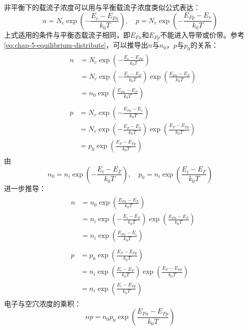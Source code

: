 非平衡下的载流子浓度可以用与平衡载流子浓度类似公式表达：
\begin{equation}
    n=N_c\exp{\left(-\frac{E_c-E_{Fn}}{k_0T}\right)},\quad p=N_v\exp{\left(-\frac{E_{Fp}-E_v}{k_0T}\right)}
\end{equation}
上式适用的条件与平衡态载流子相同，即$E_{Fn}$和$E_{Fp}$不能进入导带或价带。参考\autoref{eq:chap-5-equilibrium-distribute}，可以推导出$n$与$n_0$，$p$与$p_0$的关系：
\begin{align}
&
\begin{aligned}
    n&=N_c\exp{\left(-\frac{E_c-E_{Fn}}{k_0T}\right)}\\
    &=N_c\exp{\left(-\frac{E_c-E_{F}}{k_0T}\right)}\exp{\left(\frac{E_{Fn}-E_F}{k_0T}\right)}\\
    &=n_0\exp{\left(\frac{E_{Fn}-E_F}{k_0T}\right)}
\end{aligned}
\\
&
\begin{aligned}
    p&=N_v\exp{\left(-\frac{E_{Fp}-E_v}{k_0T}\right)}\\
    &=N_v\exp{\left(-\frac{E_{F}-E_v}{k_0T}\right)}\exp{\left(\frac{E_F-E_{Fp}}{k_0T}\right)}\\
    &=p_0\exp{\left(\frac{E_F-E_{Fp}}{k_0T}\right)}
\end{aligned}
\end{align}
由
\begin{equation}
    n_0=n_i\exp{\left(-\frac{E_i-E_F}{k_0T}\right)},\quad p_0=n_i\exp{\left(\frac{E_i-E_F}{k_0T}\right)}
\end{equation}
进一步推导：
\begin{align}
&
    \begin{aligned}
        n&=n_0\exp{\left(\frac{E_{Fn}-E_F}{k_0T}\right)}\\
        &=n_i\exp{\left(-\frac{E_i-E_F}{k_0T}\right)}\exp{\left(\frac{E_{Fn}-E_F}{k_0T}\right)}\\
        &=n_i\exp{\left(\frac{E_{Fn}-E_i}{k_0T}\right)}
    \end{aligned}
    \\
&
    \begin{aligned}
        p&=p_0\exp{\left(\frac{E_F-E_{Fp}}{k_0T}\right)}\\
        &=n_i\exp{\left(\frac{E_i-E_F}{k_0T}\right)}\exp{\left(\frac{E_F-E_{Fp}}{k_0T}\right)}\\
        &=n_i\exp{\left(\frac{E_i-E_{Fp}}{k_0T}\right)}
    \end{aligned}
\end{align}
电子与空穴浓度的乘积：
\begin{equation}
    np=n_0p_0\exp{\left(\frac{E_{Fn}-E_{Fp}}{k_0T}\right)}
\end{equation}

